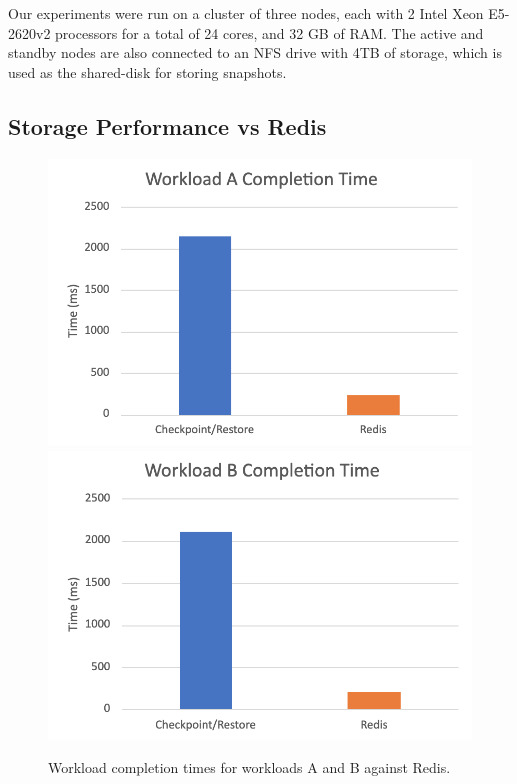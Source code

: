 \documentclass[final]{proc}
\begin{document}
Our experiments were run on a cluster of three nodes, each with 2 Intel Xeon
E5-2620v2 processors for a total of 24 cores, and 32 GB of RAM. The active and
standby nodes are also connected to an NFS drive with 4TB of storage, which is
used as the shared-disk for storing snapshots.

\subsection{Storage Performance vs Redis}

\begin{figure}
  \includegraphics[width=\columnwidth]{redis-workload-A.png}
  \includegraphics[width=\columnwidth]{redis-workload-B.png}

  \caption{Workload completion times for workloads A and B against Redis.}
  \label{fig:redis}
\end{figure}
\end{document}
